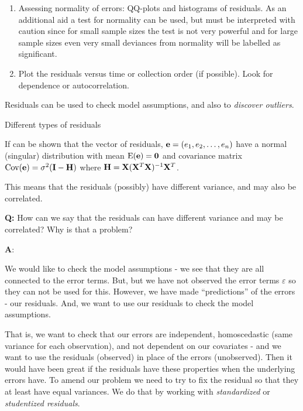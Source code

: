 \documentclass[10pt,ignorenonframetext,]{beamer}
\providecommand{\tightlist}{%
  \setlength{\itemsep}{0pt}\setlength{\parskip}{0pt}}
\begin{document}
\begin{frame}

\begin{enumerate}
\def\labelenumi{\arabic{enumi}.}
\setcounter{enumi}{2}
\tightlist
\item
  Assessing normality of errors: QQ-plots and histograms of residuals.
  As an additional aid a test for normality can be used, but must be
  interpreted with caution since for small sample sizes the test is not
  very powerful and for large sample sizes even very small deviances
  from normality will be labelled as significant.
\item
  Plot the residuals versus time or collection order (if possible). Look
  for dependence or autocorrelation.
\end{enumerate}

Residuals can be used to check model assumptions, and also to
\emph{discover outliers}.

\end{frame}

\begin{frame}

\begin{block}{Different types of residuals}

If can be shown that the vector of residuals,
\({\bf e}=(e_1,e_2,\ldots,e_n)\) have a normal (singular) distribution
with mean \(\text{E}({\bf e})={\bf 0}\) and covariance matrix
\(\text{Cov}({\bf e})=\sigma^2({\bf I}-{\bf H})\) where
\({\bf H}={\bf X}({\bf X}^T{\bf X})^{-1}{\bf X}^T\).

This means that the residuals (possibly) have different variance, and
may also be correlated.

\textbf{Q:} How can we say that the residuals can have different
variance and may be correlated? Why is that a problem?

\end{block}

\end{frame}

\begin{frame}

\textbf{A}:

We would like to check the model assumptions - we see that they are all
connected to the error terms. But, but we have not observed the error
terms \(\varepsilon\) so they can not be used for this. However, we have
made ``predictions'' of the errors - our residuals. And, we want to use
our residuals to check the model assumptions.

That is, we want to check that our errors are independent, homoscedastic
(same variance for each observation), and not dependent on our
covariates - and we want to use the residuals (observed) in place of the
errors (unobserved). Then it would have been great if the residuals have
these properties when the underlying errors have. To amend our problem
we need to try to fix the residual so that they at least have equal
variances. We do that by working with \emph{standardized} or
\emph{studentized residuals}.

\end{frame}
\end{document}
